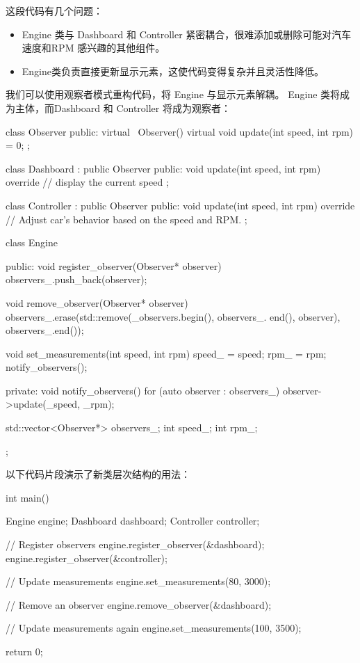 这段代码有几个问题：

\begin{itemize}
\item
Engine 类与 Dashboard 和 Controller 紧密耦合，很难添加或删除可能对汽车速度和RPM 感兴趣的其他组件。

\item
Engine类负责直接更新显示元素，这使代码变得复杂并且灵活性降低。
\end{itemize}

我们可以使用观察者模式重构代码，将 Engine 与显示元素解耦。 Engine 类将成为主体，而Dashboard 和 Controller 将成为观察者：

\begin{cpp}
class Observer {
public:
    virtual ~Observer() {}
    virtual void update(int speed, int rpm) = 0;
};

class Dashboard : public Observer {
public:
    void update(int speed, int rpm) override {
        // display the current speed
    }
};

class Controller : public Observer {
public:
    void update(int speed, int rpm) override {
        // Adjust car's behavior based on the speed and RPM.
    }
};

class Engine {
public:
    void register_observer(Observer* observer) {
        observers_.push_back(observer);
    }

    void remove_observer(Observer* observer) {
        observers_.erase(std::remove(_observers.begin(), observers_.
        end(), observer), observers_.end());
    }

    void set_measurements(int speed, int rpm) {
        speed_ = speed;
        rpm_ = rpm;
        notify_observers();
    }

private:
    void notify_observers() {
        for (auto observer : observers_) {
            observer->update(_speed, _rpm);
        }
    }

    std::vector<Observer*> observers_;
    int speed_;
    int rpm_;
};
\end{cpp}

以下代码片段演示了新类层次结构的用法：

\begin{cpp}
int main() {
    Engine engine;
    Dashboard dashboard;
    Controller controller;

    // Register observers
    engine.register_observer(&dashboard);
    engine.register_observer(&controller);

    // Update measurements
    engine.set_measurements(80, 3000);

    // Remove an observer
    engine.remove_observer(&dashboard);

    // Update measurements again
    engine.set_measurements(100, 3500);

    return 0;
}
\end{cpp}


